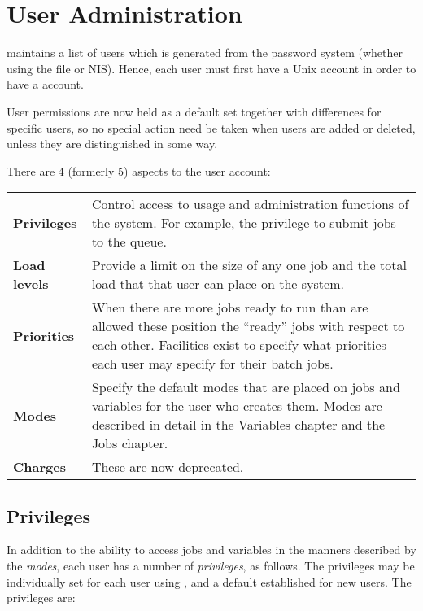 \chapter{User Administration}
\label{chp:user-administration}
\ProductName{} maintains a list of users which is generated from the password system (whether using the  file or NIS).
Hence, each user must first have a Unix account in order to have a \ProductName{} account.

User permissions are now held as a default set together with differences for specific users, so no special action need be taken when users are
added or deleted, unless they are distinguished in some way.

There are 4 (formerly 5) aspects to the \ProductName{} user account:

\begin{tabular}{l p{14cm}}
{\bfseries
Privileges} &
Control access to usage and administration functions of the system. For
example, the privilege to submit jobs to the queue. \\

{\bfseries
Load levels} &
Provide a limit on the size of any one job and the total load that that
user can place on the system. \\

{\bfseries
Priorities} &
When there are more jobs ready to run than are allowed these position
the ``ready'' jobs with respect to each
other. Facilities exist to specify what priorities each \ProductName{} user
may specify for their batch jobs. \\
{\bfseries
Modes} &
Specify the default modes that are placed on jobs and variables for the
user who creates them. Modes are described in detail in the Variables
chapter and the Jobs chapter. \\
{\bfseries
Charges} &
These are now deprecated. \\
\end{tabular}
\section{Privileges}
In addition to the ability to access jobs and variables in the manners
described by the \textit{modes}, each user has a number of
\textit{privileges}, as follows. The privileges may be individually set
for each user using \PrBtuser, and a default
established for new users. The privileges are:

